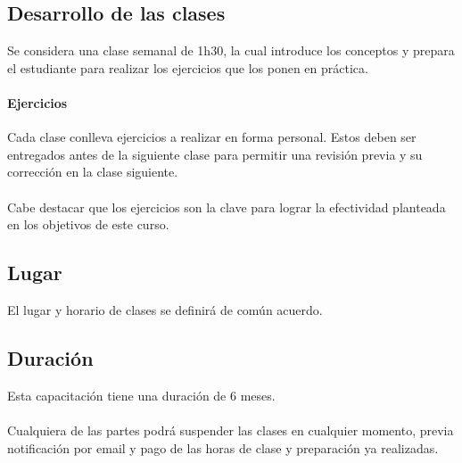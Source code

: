 \documentclass[11pt]{article}
\begin{document}
\subsection{Desarrollo de las clases}
Se considera una clase semanal de 1h30, la cual introduce los conceptos
y prepara el estudiante para realizar los ejercicios que los ponen en pr\'actica.

\paragraph{Ejercicios}
Cada clase conlleva ejercicios a realizar en forma personal.
Estos deben ser entregados antes de la siguiente clase para permitir 
una revisi\'on previa y su correcci\'on en la clase siguiente.

\paragraph{}
Cabe destacar que los ejercicios son la clave para lograr la efectividad planteada
en los objetivos de este curso.


\subsection{Lugar}
El lugar y horario de clases se definir\'a de com\'un acuerdo.


\subsection{Duraci\'on}
Esta capacitaci\'on tiene una duraci\'on de 6 meses.

\paragraph{}
Cualquiera de las partes podr\'a suspender las clases en cualquier momento, 
previa notificaci\'on por email y pago de las horas de clase y preparaci\'on
ya realizadas.


\end{document}
